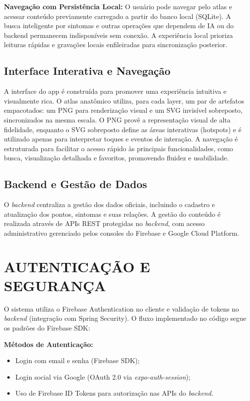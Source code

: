 \textbf{Navegação com Persistência Local:}
O usuário pode navegar pelo atlas e acessar conteúdo previamente carregado a partir do banco local (SQLite). A busca inteligente por sintomas e outras operações que dependem de IA ou do backend permanecem indisponíveis sem conexão. A experiência local prioriza leituras rápidas e gravações locais enfileiradas para sincronização posterior.

\subsection{Interface Interativa e Navegação}

A interface do app é construída para promover uma experiência intuitiva e visualmente rica. O atlas anatômico utiliza, para cada layer, um par de artefatos empacotados: um PNG para renderização visual e um SVG invisível sobreposto, sincronizados na mesma escala. O PNG provê a representação visual de alta fidelidade, enquanto o SVG sobreposto define as áreas interativas (hotspots) e é utilizado apenas para interpretar toques e eventos de interação. A navegação é estruturada para facilitar o acesso rápido às principais funcionalidades, como busca, visualização detalhada e favoritos, promovendo fluidez e usabilidade.

\subsection{Backend e Gestão de Dados}

O \textit{backend} centraliza a gestão dos dados oficiais, incluindo o cadastro e atualização dos pontos, sintomas e suas relações. A gestão do conteúdo é realizada através de APIs REST protegidas no \textit{backend}, com acesso administrativo gerenciado pelos consoles do Firebase e Google Cloud Platform.

\section{AUTENTICAÇÃO E SEGURANÇA} \label{sec:autenticacao}

O sistema utiliza o Firebase Authentication no cliente e validação de tokens no \textit{backend} (integração com Spring Security). O fluxo implementado no código segue os padrões do Firebase SDK:

\textbf{Métodos de Autenticação:}
\begin{itemize}
    \item Login com email e senha (Firebase SDK);
    \item Login social via Google (OAuth 2.0 via \textit{expo-auth-session});
    \item Uso de Firebase ID Tokens para autorização nas APIs do \textit{backend}.
\end{itemize}

